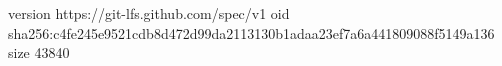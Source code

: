 version https://git-lfs.github.com/spec/v1
oid sha256:c4fe245e9521cdb8d472d99da2113130b1adaa23ef7a6a441809088f5149a136
size 43840
